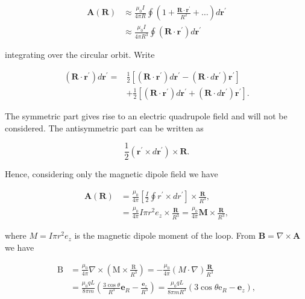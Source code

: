 \documentclass[10pt]{article}
\begin{document}
$$
\begin{aligned}
\mathbf{A}(\mathbf{R}) & \approx \frac{\mu_{0} I}{4 \pi R} \oint\left(1+\frac{\mathbf{R} \cdot \mathbf{r}^{\prime}}{R^{2}}+\ldots\right) d \mathbf{r}^{\prime} \\
& \approx \frac{\mu_{0} I}{4 \pi R^{3}} \oint\left(\mathbf{R} \cdot \mathbf{r}^{\prime}\right) d \mathbf{r}^{\prime}
\end{aligned}
$$

integrating over the circular orbit. Write

$$
\begin{aligned}
\left(\mathbf{R} \cdot \mathbf{r}^{\prime}\right) d \mathbf{r}^{\prime}=& \frac{1}{2}\left[\left(\mathbf{R} \cdot \mathbf{r}^{\prime}\right) d \mathbf{r}^{\prime}-\left(\mathbf{R} \cdot d \mathbf{r}^{\prime}\right) \mathbf{r}^{\prime}\right] \\
&+\frac{1}{2}\left[\left(\mathbf{R} \cdot \mathbf{r}^{\prime}\right) d \mathbf{r}^{\prime}+\left(\mathbf{R} \cdot d \mathbf{r}^{\prime}\right) \mathbf{r}^{\prime}\right] .
\end{aligned}
$$

The symmetric part gives rise to an electric quadrupole field and will not be considered. The antisymmetric part can be written as

$$
\frac{1}{2}\left(\mathbf{r}^{\prime} \times d \mathbf{r}^{\prime}\right) \times \mathbf{R} .
$$

Hence, considering only the magnetic dipole field we have

$$
\begin{aligned}
\mathbf{A}(\mathbf{R}) &=\frac{\mu_{0}}{4 \pi}\left[\frac{I}{2} \oint r^{\prime} \times d r^{\prime}\right] \times \frac{\mathbf{R}}{R^{3}}, \\
&=\frac{\mu_{0}}{4 \pi} I \pi r^{2} e_{z} \times \frac{\mathbf{R}}{R^{3}}=\frac{\mu_{0}}{4 \pi} \mathbf{M} \times \frac{\mathbf{R}}{R^{3}},
\end{aligned}
$$

where $M=I \pi r^{2} e_{z}$ is the magnetic dipole moment of the loop. From $\mathbf{B}=\nabla \times \mathbf{A}$ we have

$$
\begin{aligned}
\mathrm{B} &=\frac{\mu_{0}}{4 \pi} \nabla \times\left(\mathrm{M} \times \frac{\mathrm{R}}{R^{3}}\right)=-\frac{\mu_{0}}{4 \pi}(M \cdot \nabla) \frac{\mathbf{R}}{R^{3}} \\
&=\frac{\mu_{0} q L}{8 \pi m}\left(\frac{3 \cos \theta}{R^{3}} \mathbf{e}_{R}-\frac{\mathbf{e}_{z}}{R^{3}}\right)=\frac{\mu_{0} q L}{8 \pi m R^{3}}\left(3 \cos \theta \mathrm{e}_{R}-\mathbf{e}_{z}\right),
\end{aligned}
$$
\end{document}

